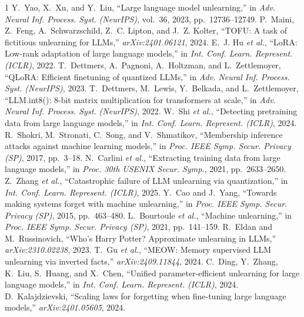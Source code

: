 \documentclass[journal]{IEEEtran}
\begin{document}
\begin{thebibliography}{1}
 Y.~Yao, X.~Xu, and Y.~Liu, ``Large language model unlearning,'' in \emph{Adv. Neural Inf. Process. Syst. (NeurIPS)}, vol.~36, 2023, pp.~12736--12749.
 P.~Maini, Z.~Feng, A.~Schwarzschild, Z.~C. Lipton, and J.~Z. Kolter, ``TOFU: A task of fictitious unlearning for LLMs,'' \emph{arXiv:2401.06121}, 2024.
 E.~J. Hu \emph{et al.}, ``LoRA: Low-rank adaptation of large language models,'' in \emph{Int. Conf. Learn. Represent. (ICLR)}, 2022.
 T.~Dettmers, A.~Pagnoni, A.~Holtzman, and L.~Zettlemoyer, ``QLoRA: Efficient finetuning of quantized LLMs,'' in \emph{Adv. Neural Inf. Process. Syst. (NeurIPS)}, 2023.
 T.~Dettmers, M.~Lewis, Y.~Belkada, and L.~Zettlemoyer, ``LLM.int8(): 8-bit matrix multiplication for transformers at scale,'' in \emph{Adv. Neural Inf. Process. Syst. (NeurIPS)}, 2022.
 W.~Shi \emph{et al.}, ``Detecting pretraining data from large language models,'' in \emph{Int. Conf. Learn. Represent. (ICLR)}, 2024.
 R.~Shokri, M.~Stronati, C.~Song, and V.~Shmatikov, ``Membership inference attacks against machine learning models,'' in \emph{Proc. IEEE Symp. Secur. Privacy (SP)}, 2017, pp.~3--18.
 N.~Carlini \emph{et al.}, ``Extracting training data from large language models,'' in \emph{Proc. 30th USENIX Secur. Symp.}, 2021, pp.~2633--2650.
 Z.~Zhang \emph{et al.}, ``Catastrophic failure of LLM unlearning via quantization,'' in \emph{Int. Conf. Learn. Represent. (ICLR)}, 2025.
 Y.~Cao and J.~Yang, ``Towards making systems forget with machine unlearning,'' in \emph{Proc. IEEE Symp. Secur. Privacy (SP)}, 2015, pp.~463--480.
 L.~Bourtoule \emph{et al.}, ``Machine unlearning,'' in \emph{Proc. IEEE Symp. Secur. Privacy (SP)}, 2021, pp.~141--159.
 R.~Eldan and M.~Russinovich, ``Who's Harry Potter? Approximate unlearning in LLMs,'' \emph{arXiv:2310.02238}, 2023.
 T.~Gu \emph{et al.}, ``MEOW: Memory supervised LLM unlearning via inverted facts,'' \emph{arXiv:2409.11844}, 2024.
 C.~Ding, Y.~Zhang, K.~Liu, S.~Huang, and X.~Chen, ``Unified parameter-efficient unlearning for large language models,'' in \emph{Int. Conf. Learn. Represent. (ICLR)}, 2024.
 D.~Kalajdzievski, ``Scaling laws for forgetting when fine-tuning large language models,'' \emph{arXiv:2401.05605}, 2024.

\end{thebibliography}
\end{document}
